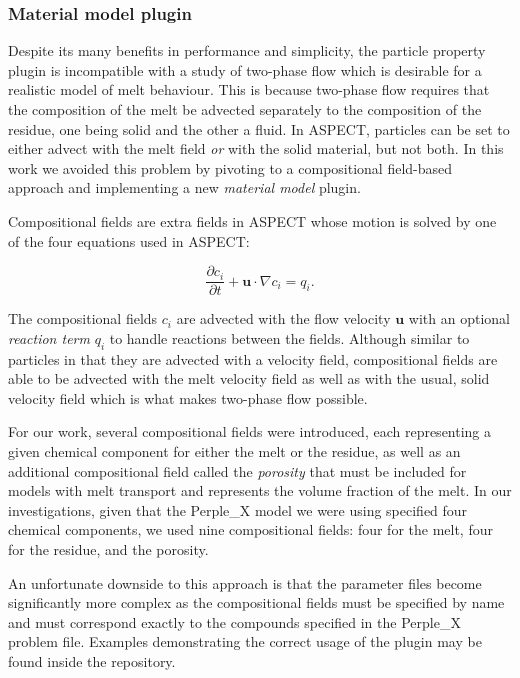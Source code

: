 \subsubsection{Material model plugin}

Despite its many benefits in performance and simplicity, the particle property plugin is incompatible with a study of two-phase flow which is desirable for a realistic model of melt behaviour.
This is because two-phase flow requires that the composition of the melt be advected separately to the composition of the residue, one being solid and the other a fluid.
In ASPECT, particles can be set to either advect with the melt field \textit{or} with the solid material, but not both.
In this work we avoided this problem by pivoting to a compositional field-based approach and implementing a new \textit{material model} plugin.

\vspace{5mm}

Compositional fields are extra fields in ASPECT whose motion is solved by one of the four \mbox{equations} used in ASPECT:

\begin{equation*}
    \frac{\partial c_i}{\partial t} + \mathbf{u} \cdot \nabla c_i = q_i.
\end{equation*}

The compositional fields $c_i$ are advected with the flow velocity $\mathbf{u}$ with an optional \textit{reaction term} $q_i$ to handle reactions between the fields. Although similar to particles in that they are advected with a velocity field, compositional fields are able to be advected with the melt velocity field as well as with the usual, solid velocity field which is what makes two-phase flow possible. 

For our work, several compositional fields were introduced, each representing a given chemical \mbox{component} for either the melt or the residue, as well as an additional compositional field called the \textit{porosity} that must be included for models with melt transport and represents the volume fraction of the melt. 
In our investigations, given that the Perple\_X model we were using specified four chemical components, we used nine compositional fields: four for the melt, four for the residue, and the porosity.

An unfortunate downside to this approach is that the parameter files become significantly more \mbox{complex} as the compositional fields must be specified by name and must correspond exactly to the compounds specified in the Perple\_X problem file.
Examples demonstrating the correct usage of the plugin may be found inside the repository.

